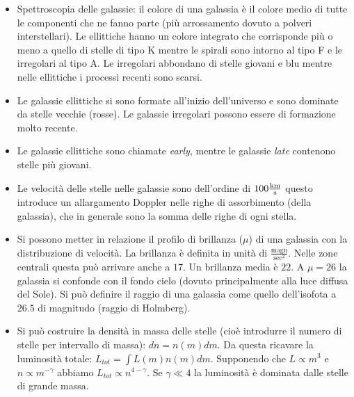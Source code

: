 \documentclass[11pt,a4paper]{article}
\begin{document}
\begin{itemize}
\item Spettroscopia delle galassie: il colore di una galassia è il colore medio di tutte le componenti che ne fanno parte (più arrossamento dovuto a polveri interstellari). Le ellittiche hanno un colore integrato che corrisponde più o
meno a quello di stelle di tipo K mentre le spirali sono intorno al tipo F e le irregolari al tipo A.
Le irregolari abbondano di stelle giovani e blu mentre nelle ellittiche i processi recenti sono scarsi.

\item Le galassie ellittiche si sono formate all'inizio dell'universo e sono dominate da stelle vecchie (rosse). Le galassie irregolari possono essere di formazione molto recente.


\item Le galassie ellittiche sono chiamate \textit{early}, mentre le galassie \textit{late} contenono stelle più giovani.

\item Le velocità delle stelle nelle galassie sono dell'ordine di $100 \si{\frac{k \meter}{\second}}$ questo introduce un allargamento Doppler nelle righe di assorbimento (della galassia), che in generale sono la somma delle righe di ogni stella.

\item Si possono metter in relazione il profilo di brillanza ($\mu$) di una galassia con la distribuzione di velocità. La brillanza è definita in unità di $\frac{\text{magn}}{\text{sec}^2}$. Nelle zone centrali questa può arrivare anche a $17$. Un brillanza media è $22$. A $\mu = 26$ la galassia si confonde con il fondo cielo (dovuto principalmente alla luce diffusa del Sole). Si può definire il raggio di una galassia come quello dell'isofota a $26.5$ di magnitudo (raggio di Holmberg).

\item Si può costruire la densità in massa delle stelle (cioè introdurre il numero di stelle per intervallo di massa): $dn = n(m) dm$. Da questa ricavare la luminosità totale: $L_{tot} = \int L(m) n(m) dm$. Supponendo che $L \propto m^3$ e $n \propto m^{-\gamma}$ abbiamo $L_{tot} \propto n^{4 - \gamma}$. Se $\gamma \ll 4$ la luminosità è dominata dalle stelle di grande massa.


\end{itemize}
\end{document}
